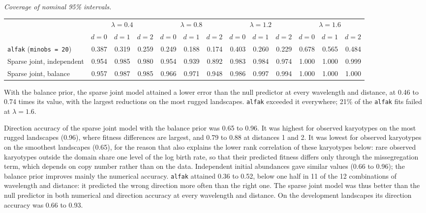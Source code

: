 \documentclass[11pt]{article}
\begin{document}
\noindent\textit{Coverage of nominal 95\% intervals.}
\begin{center}
\footnotesize
\setlength{\tabcolsep}{3pt}
\begin{tabular}{l*{12}{r}}
\toprule
 & \multicolumn{3}{c}{$\lambda=0.4$} & \multicolumn{3}{c}{$\lambda=0.8$} & \multicolumn{3}{c}{$\lambda=1.2$} & \multicolumn{3}{c}{$\lambda=1.6$} \\
\cmidrule(lr){2-4}\cmidrule(lr){5-7}\cmidrule(lr){8-10}\cmidrule(lr){11-13}
 & $d=0$ & $d=1$ & $d=2$ & $d=0$ & $d=1$ & $d=2$ & $d=0$ & $d=1$ & $d=2$ & $d=0$ & $d=1$ & $d=2$ \\
\midrule
\texttt{alfak} (\texttt{minobs = 20}) & 0.387 & 0.319 & 0.259 & 0.249 & 0.188 & 0.174 & 0.403 & 0.260 & 0.229 & 0.678 & 0.565 & 0.484 \\
Sparse joint, independent & 0.954 & 0.985 & 0.980 & 0.954 & 0.939 & 0.892 & 0.983 & 0.984 & 0.974 & 1.000 & 1.000 & 0.999 \\
Sparse joint, balance & 0.957 & 0.987 & 0.985 & 0.966 & 0.971 & 0.948 & 0.986 & 0.997 & 0.994 & 1.000 & 1.000 & 1.000 \\
\bottomrule
\end{tabular}
\end{center}

With the balance prior, the sparse joint model attained a lower error than the
null predictor at every wavelength and distance, at 0.46 to 0.74 times its
value, with the largest reductions on the most rugged landscapes.
\texttt{alfak} exceeded it everywhere; 21\% of the \texttt{alfak} fits failed
at $\lambda=1.6$.

Direction accuracy of the sparse joint model with the balance prior was 0.65
to 0.96. It was highest for observed karyotypes on the most rugged landscapes
(0.96), where fitness differences are largest, and 0.79 to 0.88 at distances 1
and 2. It was lowest for observed karyotypes on the smoothest landscapes
(0.65), for the reason that also explains the lower rank correlation of
these karyotypes below: rare observed karyotypes outside the domain share one level of the log
birth rate, so that their predicted fitness differs only through the
missegregation term, which depends on copy number rather than on the data.
Independent initial abundances gave similar values (0.66 to 0.96); the
balance prior improves mainly the numerical accuracy. \texttt{alfak}
attained 0.36 to 0.52, below one half in 11 of the 12 combinations of
wavelength and distance: it predicted the wrong direction more often than the
right one. The sparse joint model was thus better than the null predictor in
both numerical and direction accuracy at every wavelength and distance. On the development landscapes its
direction accuracy was 0.66 to 0.93.
\end{document}
